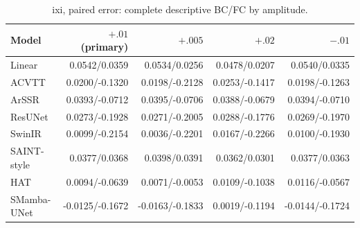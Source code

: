 \begin{table}[t]\centering\scriptsize

\caption{ixi, paired error: complete descriptive BC/FC by amplitude.}

\begin{tabular}{lrrrr}\toprule Model & $+.01$ (primary) & $+.005$ & $+.02$ & $-.01$\\\midrule

Linear & 0.0542/0.0359 & 0.0534/0.0256 & 0.0478/0.0207 & 0.0540/0.0335\\

ACVTT & 0.0200/-0.1320 & 0.0198/-0.2128 & 0.0253/-0.1417 & 0.0198/-0.1263\\

ArSSR & 0.0393/-0.0712 & 0.0395/-0.0706 & 0.0388/-0.0679 & 0.0394/-0.0710\\

ResUNet & 0.0273/-0.1928 & 0.0271/-0.2005 & 0.0288/-0.1776 & 0.0269/-0.1970\\

SwinIR & 0.0099/-0.2154 & 0.0036/-0.2201 & 0.0167/-0.2266 & 0.0100/-0.1930\\

SAINT-style & 0.0377/0.0368 & 0.0398/0.0391 & 0.0362/0.0301 & 0.0377/0.0363\\

HAT & 0.0094/-0.0639 & 0.0071/-0.0053 & 0.0109/-0.1038 & 0.0116/-0.0567\\

SMamba-UNet & -0.0125/-0.1672 & -0.0163/-0.1833 & 0.0019/-0.1194 & -0.0144/-0.1724\\

\bottomrule\end{tabular}\end{table}

